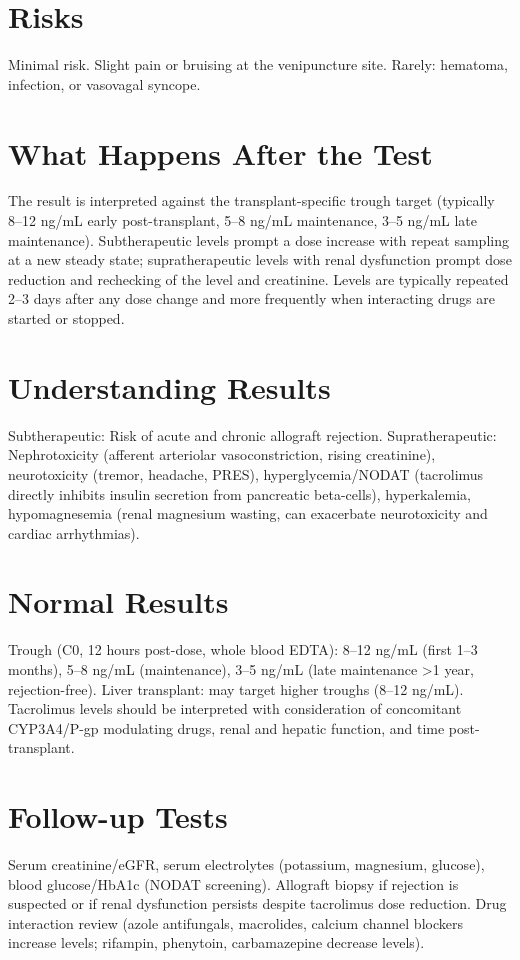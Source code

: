 \section*{Risks}
Minimal risk. Slight pain or bruising at the venipuncture site. Rarely: hematoma, infection, or vasovagal syncope.

\section*{What Happens After the Test}
The result is interpreted against the transplant-specific trough target (typically 8--12 ng/mL early post-transplant, 5--8 ng/mL maintenance, 3--5 ng/mL late maintenance). Subtherapeutic levels prompt a dose increase with repeat sampling at a new steady state; supratherapeutic levels with renal dysfunction prompt dose reduction and rechecking of the level and creatinine. Levels are typically repeated 2--3 days after any dose change and more frequently when interacting drugs are started or stopped.

\section*{Understanding Results}
Subtherapeutic: Risk of acute and chronic allograft rejection. Supratherapeutic: Nephrotoxicity (afferent arteriolar vasoconstriction, rising creatinine), neurotoxicity (tremor, headache, PRES), hyperglycemia/NODAT (tacrolimus directly inhibits insulin secretion from pancreatic beta-cells), hyperkalemia, hypomagnesemia (renal magnesium wasting, can exacerbate neurotoxicity and cardiac arrhythmias).

\section*{Normal Results}
Trough (C0, 12 hours post-dose, whole blood EDTA): 8--12 ng/mL (first 1--3 months), 5--8 ng/mL (maintenance), 3--5 ng/mL (late maintenance >1 year, rejection-free). Liver transplant: may target higher troughs (8--12 ng/mL). Tacrolimus levels should be interpreted with consideration of concomitant CYP3A4/P-gp modulating drugs, renal and hepatic function, and time post-transplant.

\section*{Follow-up Tests}
Serum creatinine/eGFR, serum electrolytes (potassium, magnesium, glucose), blood glucose/HbA1c (NODAT screening). Allograft biopsy if rejection is suspected or if renal dysfunction persists despite tacrolimus dose reduction. Drug interaction review (azole antifungals, macrolides, calcium channel blockers increase levels; rifampin, phenytoin, carbamazepine decrease levels).

